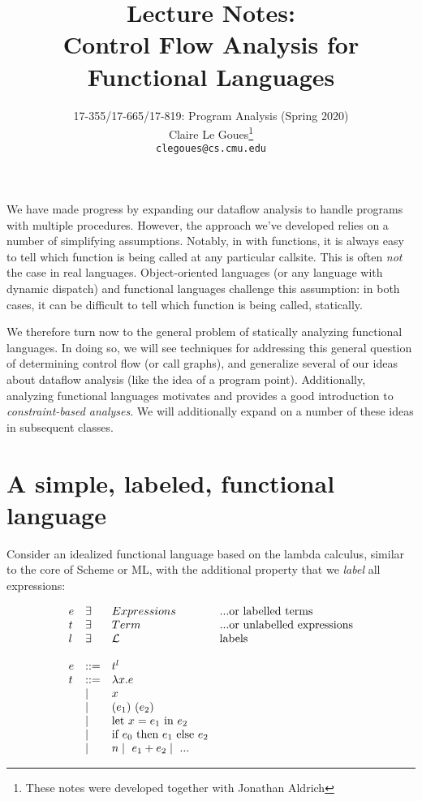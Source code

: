 \documentclass[11pt]{article}
\title{Lecture Notes:\\
		Control Flow Analysis for Functional Languages}
\author{17-355/17-665/17-819: Program Analysis (Spring 2020)\\
        Claire Le Goues\footnote{These notes were developed together with Jonathan Aldrich}\\
		{\tt clegoues@cs.cmu.edu}}
\date{}
\begin{document}
\maketitle

We have made progress by expanding our dataflow analysis to handle programs with
multiple procedures. However, the approach we've developed relies on a number of
simplifying assumptions. Notably, in \WhileThAddr with functions, it is always
easy to tell which function is being called at any particular callsite. This is
often \emph{not} the case in real languages. Object-oriented languages (or any
language with dynamic dispatch) and functional languages challenge this
assumption: in both cases, it can be difficult to tell which function is being
called, statically.

We therefore turn now to the general problem of statically analyzing functional
languages. In doing so, we will see techniques for addressing this general
question of determining control flow (or call graphs), and generalize several of
our ideas about dataflow analysis (like the idea of a program point).
Additionally, analyzing functional languages motivates and provides a good
introduction to \emph{constraint-based analyses}. We will additionally expand on
a number of these ideas in subsequent classes.

\section{A simple, labeled, functional language}

Consider an idealized functional language based on the lambda calculus,
similar to the core of Scheme or ML, with the additional property that we \emph{label} all expressions:

\[
\begin{array}{lllll}
e  & \exists & Expressions & \mbox{...or labelled terms} \\
t  & \exists & Term  & \mbox{...or unlabelled expressions} \\
l & \exists & \mathcal{L} & \mbox{labels} \\
\\
e & ::= & t ^ l \\
t &  ::= & \lambda x . e \\
  & \mathrel{\mid} & x \\
  & \mathrel{\mid} & (e_1) ~ (e_2) \\
  & \mathrel{\mid} & \mbox{let}~x = e_1~\mbox{in}~e_2 \\
  & \mathrel{\mid} & \mbox{if}~e_0~\mbox{then}~e_1~\mbox{else}~e_2 \\
  & \mathrel{\mid} & n \mathrel{\mid}~e_1 + e_2 \mathrel{\mid}~ ... \\
\end{array}
\]
\end{document}
